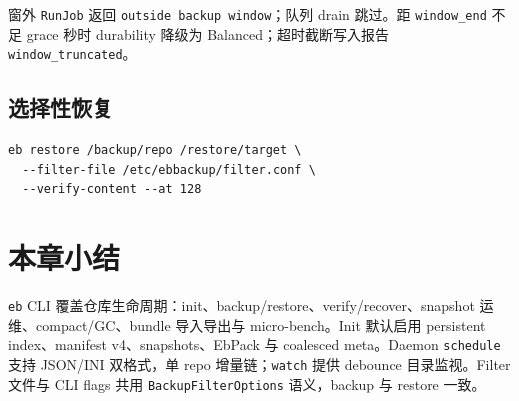 窗外 \texttt{RunJob} 返回 \texttt{outside backup window}；队列 drain 跳过。距 \texttt{window\_end} 不足 grace 秒时 durability 降级为 Balanced；超时截断写入报告 \texttt{window\_truncated}。

\subsection{选择性恢复}

\begin{lstlisting}[caption={filter 恢复 + 内容校验},label={lst:workflow-restore}]
eb restore /backup/repo /restore/target \
  --filter-file /etc/ebbackup/filter.conf \
  --verify-content --at 128
\end{lstlisting}

\section{本章小结}

\texttt{eb} CLI 覆盖仓库生命周期：init、backup/restore、verify/recover、snapshot 运维、compact/GC、bundle 导入导出与 micro-bench。Init 默认启用 persistent index、manifest v4、snapshots、EbPack 与 coalesced meta。Daemon \texttt{schedule} 支持 JSON/INI 双格式，单 repo  增量链；\texttt{watch} 提供 debounce 目录监视。Filter 文件与 CLI flags 共用 \texttt{BackupFilterOptions} 语义，backup 与 restore 一致。
